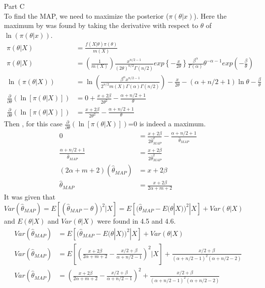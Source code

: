 \documentclass[11pt]{article}
\begin{document}
\vspace{5mm}
Part C \\
To find the MAP, we need to maximize the posterior ($\pi(\theta|x)$). Here the maximum by was found by taking the derivative with respect to $\theta$ of $\ln (\pi(\theta|x))$.  
\begin{align*}
\pi(\theta|X) &=\frac{ f(X| \theta) \pi (\theta)}{m(X)} \\
\pi(\theta|X) &=\left(\frac{1}{m(X)} \right) \frac{x^{n/2-1}}{(2\theta)^{n/2} \Gamma(n/2)}exp\left\{-\frac{x}{2\theta} \right\}  \frac{\beta^\alpha}{\Gamma(\alpha)}\theta^{-\alpha-1} exp\left(-\frac{\beta}{\theta}\right) \\
\ln (\pi(\theta|X)) &= \ln \left(\frac{\beta^\alpha x^{n/2-1} }{2^{n/2} m(X) \Gamma(\alpha) \Gamma(n/2)}  \right) -\frac{x}{2 \theta}-(\alpha+n/2+1) \ln \theta -\frac{\beta}{\theta} \\
\frac{\partial}{\partial \theta} \left( \ln [\pi(\theta|X)] \right) &= 0+\frac{x+2\beta}{2\theta^2} -\frac{\alpha+n/2+1}{\theta}  \\
\frac{\partial}{\partial \theta} \left( \ln [\pi(\theta|X)] \right) &= \frac{x+2\beta}{2\theta^2} -\frac{\alpha+n/2+1}{\theta}
\end{align*}
Then , for this case $\frac{\partial}{\partial \theta} \left( \ln [\pi(\theta|X)] \right)$=0 is indeed a maximum.  
\begin{align*}
0 &=\frac{x+2\beta}{2\hat{\theta}_{MAP}^2} -\frac{\alpha+n/2+1}{\hat{\theta}_{MAP}}\\
\frac{\alpha+n/2+1}{\hat{\theta}_{MAP}}&=\frac{x+2\beta}{2\hat{\theta}_{MAP}^2}\\
(2\alpha+m+2)(\hat{\theta}_{MAP}) &= x+2\beta \\
\hat{\theta}_{MAP}&=\frac{x+2\beta}{2\alpha+m+2}
\end{align*}
It was given that $Var(\hat{\theta}_{MAP})=E[(\hat{\theta}_{MAP}-\theta))^2|X]=E[(\hat{\theta}_{MAP}-E(\theta|X))^2|X]+Var(\theta|X)$ and $E(\theta|X)$ and $Var(\theta|X)$ were found in 4.5 and 4.6. 
\begin{align*}
Var(\hat{\theta}_{MAP}) &= E\left[(\hat{\theta}_{MAP}-E(\theta|X))^2|X\right]+Var\left(\theta|X\right) \\
Var(\hat{\theta}_{MAP}) &= E \left[ \left( \frac{x+2\beta}{2\alpha+m+2} -\frac{x/2+\beta}{\alpha+n/2-1} \right)^2 |X \right]+\frac{x/2+\beta}{(\alpha+n/2-1)^2(\alpha+n/2-2)}  \\
Var(\hat{\theta}_{MAP}) &=  \left( \frac{x+2\beta}{2\alpha+m+2} -\frac{x/2+\beta}{\alpha+n/2-1} \right)^2 +\frac{x/2+\beta}{(\alpha+n/2-1)^2(\alpha+n/2-2)} 
\end{align*}
\end{document}
